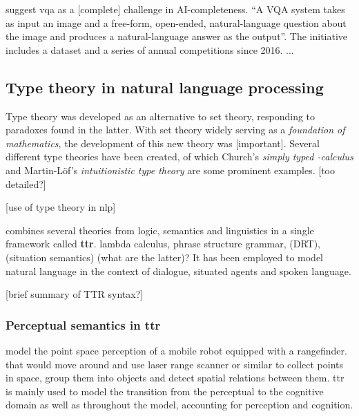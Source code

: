 \documentclass[11pt, a4paper]{article}
\begin{document}
\cite{AgrawalVQAVisualQuestion2015} suggest \acrfull{vqa} as a [complete] challenge in AI-completeness.
``A VQA system takes as input an image and a free-form, open-ended, natural-language question about the image and produces a natural-language answer as the output''.
The initiative includes a dataset and a series of annual competitions since 2016.
...



\subsection{Type theory in natural language processing}

Type theory was developed as an alternative to set theory, responding to paradoxes found in the latter.
With set theory widely serving as a \textit{foundation of mathematics}, the development of this new theory was [important].
Several different type theories have been created, of which Church's \textit{simply typed \textlambda-calculus} \cite{church40} and Martin-Löf's \textit{intuitionistic type theory} \citep{martinlof84} are some prominent examples.
\citep{CoquandTypeTheory2015} [too detailed?]

[use of type theory in nlp]

\cite{CooperRecordsRecordTypes2005} combines several theories from logic, semantics and linguistics in a single framework called \textbf{\acrfull{ttr}}.
 lambda calculus, phrase structure grammar, (DRT), (situation semantics) (what are the latter)?
It has been employed to model natural language in the context of dialogue, situated agents and spoken language.

[brief summary of TTR syntax?]



\subsubsection{Perceptual semantics in \gls{ttr}}

\cite{LarssonDialoguesHaveContent2011}

\cite{DobnikModellinglanguageaction2012}

\cite{lspc} model the point space perception of a mobile robot equipped with a rangefinder.
 that would move around and use laser range scanner or similar to collect points in space, group them into objects and detect spatial relations between them.
\Gls{ttr} is mainly used to model the transition from the perceptual to the cognitive domain as well as 
 throughout the model, accounting for perception and cognition.
\end{document}

